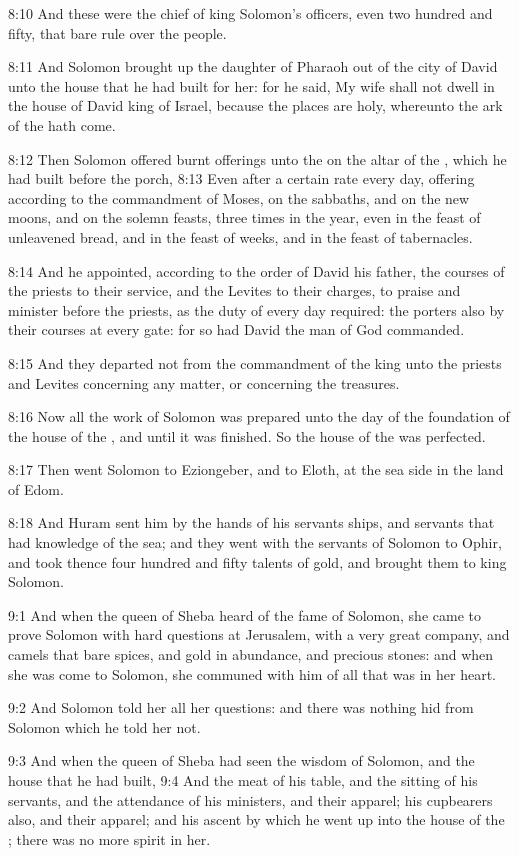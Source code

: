 8:10 And these were the chief of king Solomon's officers, even two hundred and fifty, that bare rule over the people.

8:11 And Solomon brought up the daughter of Pharaoh out of the city of David unto the house that he had built for her: for he said, My wife shall not dwell in the house of David king of Israel, because the places are holy, whereunto the ark of the \LORD hath come.

8:12 Then Solomon offered burnt offerings unto the \LORD on the altar of the \LORD, which he had built before the porch, 8:13 Even after a certain rate every day, offering according to the commandment of Moses, on the sabbaths, and on the new moons, and on the solemn feasts, three times in the year, even in the feast of unleavened bread, and in the feast of weeks, and in the feast of tabernacles.

8:14 And he appointed, according to the order of David his father, the courses of the priests to their service, and the Levites to their charges, to praise and minister before the priests, as the duty of every day required: the porters also by their courses at every gate: for so had David the man of God commanded.

8:15 And they departed not from the commandment of the king unto the priests and Levites concerning any matter, or concerning the treasures.

8:16 Now all the work of Solomon was prepared unto the day of the foundation of the house of the \LORD, and until it was finished. So the house of the \LORD was perfected.

8:17 Then went Solomon to Eziongeber, and to Eloth, at the sea side in the land of Edom.

8:18 And Huram sent him by the hands of his servants ships, and servants that had knowledge of the sea; and they went with the servants of Solomon to Ophir, and took thence four hundred and fifty talents of gold, and brought them to king Solomon.

9:1 And when the queen of Sheba heard of the fame of Solomon, she came to prove Solomon with hard questions at Jerusalem, with a very great company, and camels that bare spices, and gold in abundance, and precious stones: and when she was come to Solomon, she communed with him of all that was in her heart.

9:2 And Solomon told her all her questions: and there was nothing hid from Solomon which he told her not.

9:3 And when the queen of Sheba had seen the wisdom of Solomon, and the house that he had built, 9:4 And the meat of his table, and the sitting of his servants, and the attendance of his ministers, and their apparel; his cupbearers also, and their apparel; and his ascent by which he went up into the house of the \LORD; there was no more spirit in her.

